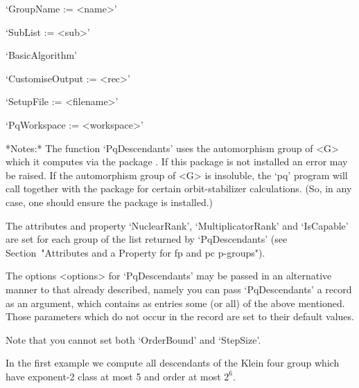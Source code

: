 \item{}`GroupName := <name>'

\item{}`SubList := <sub>'

\item{}`BasicAlgorithm'

\item{}`CustomiseOutput := <rec>'

\item{}`SetupFile := <filename>'

\item{}`PqWorkspace := <workspace>'

\endlist

*Notes:*
The function `PqDescendants' uses the  automorphism group of <G> which it
computes via the package {\AutPGrp}.  If this package is not installed an
error may be  raised. If the automorphism group of  <G> is insoluble, the
`pq' program  will call {\GAP}  together with the {\AutPGrp}  package for
certain  orbit-stabilizer calculations.   (So,  in any  case, one  should
ensure the {\AutPGrp} package is installed.)

The  attributes  and  property  `NuclearRank',  `MultiplicatorRank'   and
`IsCapable'  are  set  for  each  group   of   the   list   returned   by
`PqDescendants' (see Section~"Attributes and a Property  for  fp  and  pc
p-groups").

The options <options> for `PqDescendants' may be passed in an alternative
manner to that already described, namely you can pass  `PqDescendants'  a
record as an argument, which contains as entries some  (or  all)  of  the
above mentioned. Those parameters which do not occur in  the  record  are
set to their default values.

Note that you cannot set both `OrderBound' and `StepSize'.

In the first example  we  compute all descendants of the Klein four group
which have exponent-2 class at most 5 and order at most $2^6$.

